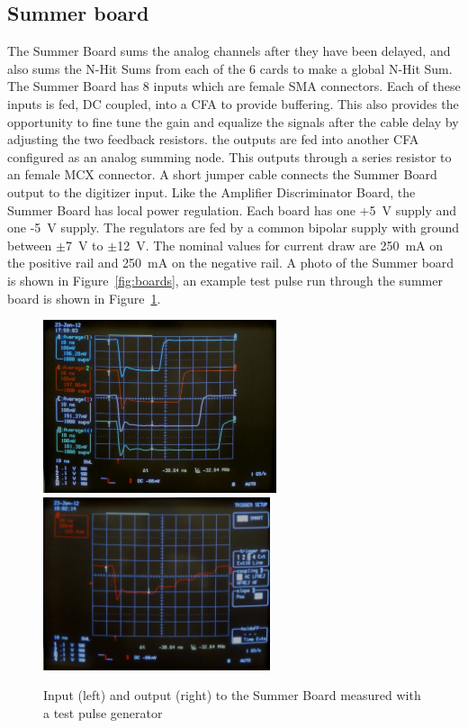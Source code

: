 \documentclass{JINST}
\begin{document}
\subsection{Summer board}
\label{sec:Sum}
%
The Summer Board sums the analog channels after they have been
delayed, and also sums the N-Hit Sums from each of the 6 cards to make
a global N-Hit Sum.  The Summer Board has 8 inputs which are female
SMA connectors.  Each of these inputs is fed, DC coupled, into a CFA
to provide buffering.  This also provides the opportunity to fine tune
the gain and equalize the signals after the cable delay by adjusting
the two feedback resistors.  the outputs are fed into another CFA
configured as an analog summing node.  This outputs through a series
resistor to an female MCX connector.  A short jumper cable connects
the Summer Board output to the digitizer input.  Like the Amplifier
Discriminator Board, the Summer Board has local power regulation.
Each board has one +5~V supply and one -5~V supply.  The regulators are
fed by a common bipolar supply with ground between $\pm$7~V to $\pm$12~V.
The nominal values for current draw are 250~mA on the positive
rail and 250~mA on the negative rail.  A photo of the Summer
board is shown in Figure~\ref{fig:boards}, an example test pulse run
through the summer board is shown in Figure~\ref{fig:summerpulse}.

\begin{figure}[ht]
	\begin{center}
		\includegraphics[height=2in, keepaspectratio=true]{graphics/sumpulseinput.jpg}
		\includegraphics[height=2in, keepaspectratio=true]{graphics/sumpulseoutput.jpg}
		\caption{Input (left) and output (right) to the Summer Board measured with a test pulse generator
		\label{fig:summerpulse}}
	\end{center}
\end{figure}
\end{document}
